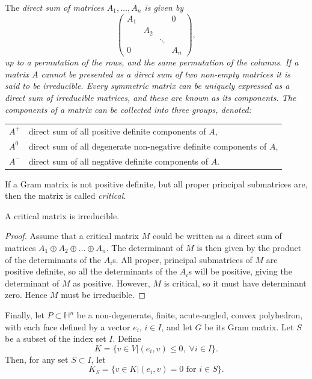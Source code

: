 \documentclass[smallcondensed]{svjour3}                     %
\begin{document}
The \em direct sum \em of matrices $A_1, \ldots, A_n$ is given by
\[\begin{pmatrix} A_1 &  &  & 0\\
    & A_2 &  &  \\
    &     & \ddots & \\
 0  &  &  &  A_n
    \end{pmatrix},\]
up to a permutation of the rows, and the same permutation of the columns. If a matrix $A$ cannot be presented as a direct sum of two non-empty matrices it is said to be \emph{irreducible}. Every symmetric matrix can be uniquely expressed as a direct sum of irreducible matrices, and these are known as its \emph{components}. The components of a matrix can be collected into three groups, denoted:
\begin{table}[h]
\centering
\begin{tabular}{l|l}
  $A^+$ & direct sum of all positive definite components of $A$,\\
  $A^0$ & direct sum of all degenerate non-negative definite components of $A$,\\
  $A^-$ & direct sum of all negative definite components of $A$.\\
\end{tabular}
\end{table}

If a Gram matrix is not positive definite, but all proper principal submatrices are, then the matrix is called \em critical. \em 
\begin{proposition}
A critical matrix is irreducible.
\end{proposition}
\begin{proof}
Assume that a critical matrix $M$ could be written as a direct sum of matrices $A_1 \oplus A_2 \oplus \ldots \oplus A_n$. The determinant of $M$ is then given by the product of the determinants of the $A_i$s. All proper, principal submatrices of $M$ are positive definite, so all the determinants of the $A_i$s will be positive, giving the determinant of $M$ as positive. However, $M$ is critical, so it must have determinant zero. Hence $M$ must be irreducible.
\end{proof}

Finally, let $P \subset \mathbb{H}^n$ be a non-degenerate, finite, acute-angled, convex polyhedron, with each face defined by a vector $e_i$, $i \in I$, and let $G$ be its Gram matrix. Let $S$ be a subset of the index set $I$. Define
\[K = \{v\in V |  (e_i, v) \le 0, \; \forall i \in I\}.\]
Then, for any set $S\subset I$, let
\[K_S=\{v \in K | (e_i, v) = 0 \text{ for } i \in S\}.\]
\end{document}
